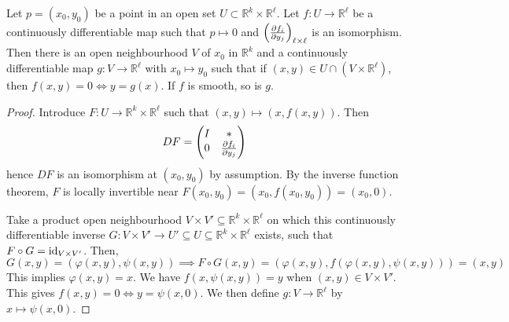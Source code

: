 \documentclass[a4paper]{article}
\begin{document}
\begin{theorem}
	Let \( p = (x_0, y_0) \) be a point in an open set \( U \subset \mathbb R^k \times \mathbb R^\ell \).
	Let \( f \colon U \to \mathbb R^\ell \) be a continuously differentiable map such that \( p \mapsto 0 \) and \( \qty(\pdv{f_i}{y_j})_{\ell \times \ell} \) is an isomorphism.
	Then there is an open neighbourhood \( V \) of \( x_0 \) in \( \mathbb R^k \) and a continuously differentiable map \( g \colon V \to \mathbb R^\ell \) with \( x_0 \mapsto y_0 \) such that if \( (x,y) \in U \cap (V \times \mathbb R^\ell) \), then \( f(x,y)=0\iff y=g(x) \).
	If \( f \) is smooth, so is \( g \).
\end{theorem}
\begin{proof}
	Introduce $ F:U\to \mathbb{R}^{k} \times \mathbb{R}^{\ell} $ such that $ (x,y) \mapsto (x,f(x,y)) $. Then 
	\[
		DF = \begin{pmatrix}
			I & \ast           \\
			0 & \pdv{f_i}{y_j}
		\end{pmatrix}
	\]
	hence \( DF \) is an isomorphism at \( (x_0, y_0) \) by assumption. By the inverse function theorem, \( F \) is locally invertible near \( F(x_0,y_0) = (x_0,f(x_0,y_0)) = (x_0, 0) \).

	 Take a product open neighbourhood \( V \times V' \subseteq \mathbb R^k \times \mathbb R^\ell \) on which this continuously differentiable inverse \( G \colon V \times V' \to U' \subseteq U \subseteq \mathbb R^k \times \mathbb R^\ell \) exists, such that \( F \circ G = \operatorname{id}_{V \times V'} \).
	 Then,
	\[
		G(x,y) = (\varphi(x,y), \psi(x,y)) \implies F \circ G(x,y) = (\varphi(x,y), f(\varphi(x,y), \psi(x,y))) = (x,y)
	\]
	This implies \( \varphi(x,y) = x \).
	We have \( f(x,\psi(x,y)) = y \) when \( (x,y) \in V \times V' \).
	This gives \( f(x,y) = 0 \iff y = \psi(x,0) \).
	We then define \( g \colon V \to \mathbb R^\ell \) by \( x \mapsto \psi(x,0) \).
\end{proof}
\end{document}
